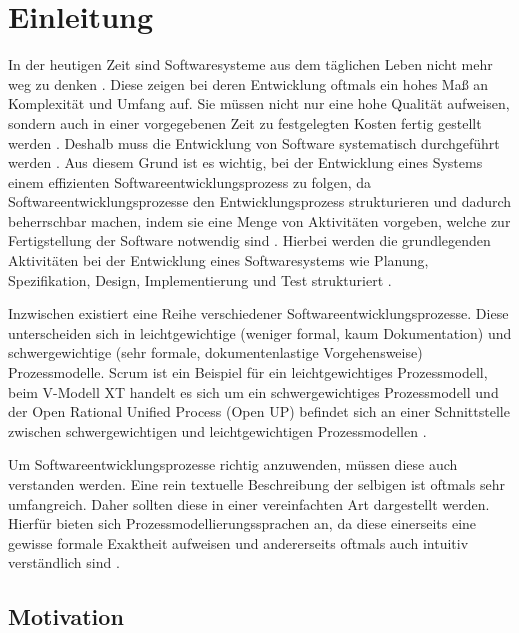 \chapter{Einleitung}\label{sec:chapter1}

In der heutigen Zeit sind Softwaresysteme aus dem täglichen Leben nicht mehr weg zu denken \cite{Puntambekar2007}. Diese zeigen bei deren Entwicklung oftmals ein hohes Maß an Komplexität und Umfang auf. Sie müssen nicht nur eine hohe Qualität aufweisen, sondern auch in einer vorgegebenen Zeit zu festgelegten Kosten fertig gestellt werden \cite{Grechenig2010}. Deshalb muss die Entwicklung von Software systematisch durchgeführt werden \cite{gumm2012einfuhrung}. Aus diesem Grund ist es wichtig, bei der Entwicklung eines Systems einem effizienten Softwareentwicklungsprozess zu folgen, da Softwareentwicklungsprozesse den Entwicklungsprozess strukturieren und dadurch beherrschbar machen, indem sie eine Menge von Aktivitäten vorgeben, welche zur Fertigstellung der Software notwendig sind \cite{richling2011autonomie}. Hierbei werden die grundlegenden Aktivitäten bei der Entwicklung eines Softwaresystems wie Planung, Spezifikation, Design, Implementierung und Test strukturiert \cite{gumm2012einfuhrung, Hanser2010}. \newline

Inzwischen existiert eine Reihe verschiedener Softwareentwicklungsprozesse. Diese unterscheiden sich in leichtgewichtige (weniger formal, kaum Dokumentation) und schwergewichtige (sehr formale, dokumentenlastige Vorgehensweise) Prozessmodelle. Scrum ist ein Beispiel für ein leichtgewichtiges Prozessmodell, beim V-Modell XT handelt es sich um ein schwergewichtiges Prozessmodell und der Open Rational Unified Process (Open UP) befindet sich an einer Schnittstelle zwischen schwergewichtigen und leichtgewichtigen Prozessmodellen \cite{Hanser2010}.\newline

Um Softwareentwicklungsprozesse richtig anzuwenden, müssen diese auch verstanden werden. Eine rein textuelle Beschreibung der selbigen ist oftmals sehr umfangreich. Daher sollten diese in einer vereinfachten Art dargestellt werden. Hierfür bieten sich Prozessmodellierungssprachen an, da diese einerseits eine gewisse formale Exaktheit aufweisen und andererseits oftmals auch intuitiv verständlich sind \cite{thomas2009,kircher2006}. \newline

\section{Motivation}



